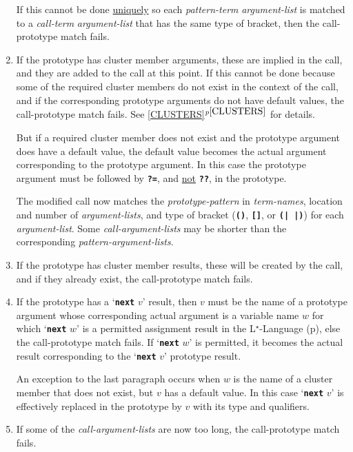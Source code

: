 \documentclass[12pt]{article}
\newcommand{\LSTAR}{L$^\star$}
\newcommand{\TT}[1]{{\tt \bfseries #1}}
\newcommand{\itemref}[1]{\ref{#1}$^{p\pageref{#1}}$}
\newcommand{\pagref}[1]{p\pageref{#1}}
\begin{document}
\begin{enumerate}
If this cannot be done \underline{uniquely}
so each {\em pattern-term} {\em argument-list}
is matched to a {\em call-term} {\em argument-list}
that has the same type of bracket, then the call-prototype match fails.

\item
\label{CLUSTER-MEMBER-ARGUMENTS}
If the prototype
has cluster member arguments,
these are implied in the call, and they are added to the call
at this point.  If this cannot be done because some of the required
cluster members do not exist in the context of the call, and if the
corresponding prototype arguments do not have default values,
the call-prototype match fails.  See \itemref{CLUSTERS} for details.

But if a required cluster member does not exist and the prototype
argument does have a default value, the default value becomes the
actual argument corresponding to the prototype argument.
In this case the prototype argument must be followed by \TT{?=},
and \underline{not} \TT{??}, in the prototype.

The modified call now matches
the {\em prototype-pattern} in {\em term-names},
location and number of {\em argument-lists}, and type of bracket (\TT{()},
\TT{[]}, or \TT{(|~|)}) for each {\em argument-list}.  Some
{\em call-argument-lists} may be shorter than the corresponding
{\em pattern-argument-lists}.

\item
If the prototype has cluster member results,
these will be created by the call, and if they already exist,
the call-prototype match fails.

\item\label{NEXT-CALL-PROTOTYPE-MATCHING}
If the prototype has a `\TT{next} $v$' result, then $v$ must be the
name of a prototype argument whose corresponding actual argument is
a variable name $w$ for which `\TT{next} $w$' is a permitted assignment
result in the \LSTAR-Language (\pagref{LSTAR-LANGUAGE}), else the
call-prototype match fails.  If `\TT{next} $w$' is permitted, it
becomes the actual result corresponding to the `\TT{next} $v$' prototype
result.

An exception to the last paragraph occurs when $w$ is the name of
a cluster member that does not exist, but $v$ has a default value.
In this case `\TT{next} $v$' is effectively replaced in the prototype
by $v$ with its type and qualifiers.

\item
If some of the {\em call-argument-lists} are now too long, the call-prototype
match fails.


\end{enumerate}
\end{document}
